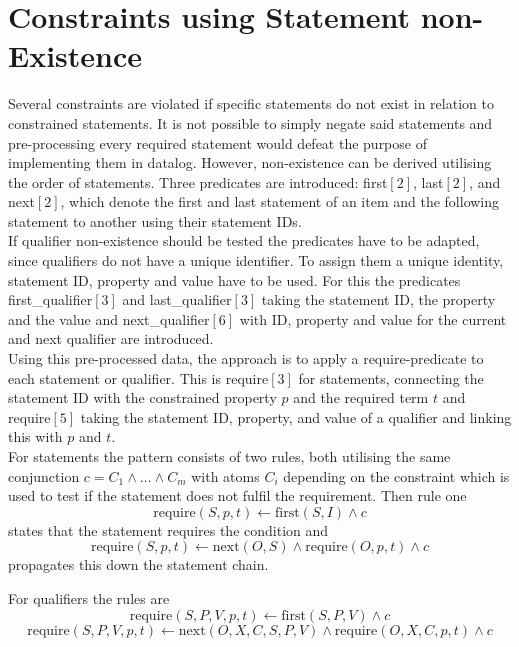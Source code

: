 \documentclass[hyperref,bachelorofscience,fleqn]{cgvpub}
\begin{document}
 \section{Constraints using Statement non-Existence}
Several constraints are violated if specific statements do not exist in relation to constrained statements. It is not possible to simply negate said statements and pre-processing every required statement would defeat the purpose of implementing them in datalog. However, non-existence can be derived utilising the order of statements. Three predicates are introduced: first\([2]\), last\([2]\), and next\([2]\), which denote the first and last statement of an item and the following statement to another using their statement IDs.\\

If qualifier non-existence should be tested the predicates have to be adapted, since qualifiers do not have a unique identifier. To assign them a unique identity, statement ID, property and value have to be used. For this the predicates first\_qualifier\([3]\) and last\_qualifier\([3]\) taking the statement ID, the property and the value and next\_qualifier\([6]\) with ID, property and value for the current and next qualifier are introduced.\\

Using this pre-processed data, the approach is to apply a require-predicate to each statement or qualifier. This is require\([3]\) for statements, connecting the statement ID with the constrained property \(p\) and the required term \(t\) and require\([5]\) taking the statement ID, property, and value of a qualifier and linking this with \(p\) and \(t\).\\

For statements the pattern consists of two rules, both utilising the same conjunction \(c = C_1 \wedge \ldots \wedge C_m\) with atoms \(C_i\) depending on the constraint which is used to test if the statement does not fulfil the requirement. Then rule one
\begin{equation*}
\text{require}(S, p, t) \leftarrow \text{first}(S, I) \wedge c
\end{equation*}
states that the statement requires the condition and
\begin{equation*}
\text{require}(S, p, t) \leftarrow \text{next}(O, S) \wedge \text{require}(O, p, t) \wedge c
\end{equation*}
propagates this down the statement chain.

For qualifiers the rules are
\begin{equation*}
\text{require}(S, P, V, p, t) \leftarrow \text{first}(S, P, V) \wedge c
\end{equation*}
\begin{equation*}
\text{require}(S, P, V, p, t) \leftarrow \text{next}(O, X, C, S, P, V) \wedge \text{require}(O, X, C, p, t) \wedge c
\end{equation*}
\end{document}
